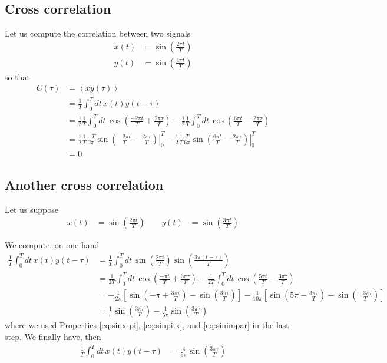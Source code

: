 \documentclass{article}
\begin{document}
\subsection*{Cross correlation}
Let us compute the correlation between two signals
\begin{align}
  x(t)&= \sin \left( \frac{2 \pi t}{T} \right) \\
  y(t)&= \sin \left( \frac{4 \pi t}{T} \right)
\end{align}
so that
\begin{align}
  C(\tau) &= \left< x y(\tau) \right> \\
          &= \frac{1}{T}\int_0^{T} dt\, x(t) y(t-\tau) \\
          &= \frac{1}{2} \frac{1}{T} \int_0^T dt\, \cos\left( \frac{-2\pi t}{T} + \frac{2 \pi \tau}{T} \right)
           - \frac{1}{2} \frac{1}{T} \int_0^T dt\, \cos\left( \frac{ 6\pi t}{T} - \frac{2 \pi \tau}{T} \right) \\
           &=\frac{1}{2} \frac{1}{T} \left. \frac{-T}{2\pi} \sin \left(  \frac{-2\pi t}{T}- \frac{2 \pi \tau}{T} \right) \right|_{0}^{T}
             - \frac{1}{2} \frac{1}{T} \left. \frac{T}{6\pi} \sin \left(  \frac{6\pi t}{T}- \frac{2 \pi \tau}{T} \right) \right|_{0}^{T} \\
           &= 0
\end{align}


\subsection*{Another cross correlation}
Let us suppose 
\begin{align}
  x(t) &= \sin\left( \frac{2\pi t}{T}\right)\,\quad & y(t) &= \sin\left( \frac{3\pi t}{T}\right)
\end{align}

We compute, on one hand
\begin{align}
  \frac{1}{T} \int_0^T dt\, x(t) y(t-\tau) &=
  \frac{1}{T} \int_0^T dt\, \sin\left( \frac{2\pi t}{T}\right) \sin\left( \frac{3\pi (t-\tau)}{T}\right) \\
  &= \frac{1}{2T} \int_0^T dt\, \cos \left( \frac{-\pi t}{T} + \frac{3\pi \tau}{T}\right)
  -  \frac{1}{2T} \int_0^T dt\, \cos \left( \frac{5\pi t}{T} - \frac{3\pi \tau}{T}\right) \\
  &= 
  -\frac{1}{2\pi} \left[
    \sin\left(-\pi + \frac{3\pi\tau}{T} \right)
    - \sin\left(\frac{3\pi\tau}{T} \right)
  \right]
  -\frac{1}{10\pi} \left[
    \sin\left(5\pi - \frac{3\pi\tau}{T} \right)
    - \sin\left(\frac{-3\pi\tau}{T} \right)
  \right] \\
  &= \frac{1}{\pi} 
    \sin\left(\frac{3\pi\tau}{T} \right)
  -\frac{1}{5\pi}
    \sin\left(\frac{3\pi\tau}{T} \right)
\end{align}
where we used Properties \ref{eq:sinx-pi}, \ref{eq:sinpi-x}, and \ref{eq:sinimpar} in the last step. We finally have, then
\begin{align}
  \frac{1}{T} \int_0^T dt\, x(t) y(t-\tau) &=
 \frac{4}{5\pi} 
    \sin\left(\frac{3\pi\tau}{T} \right)
\end{align}
\end{document}
